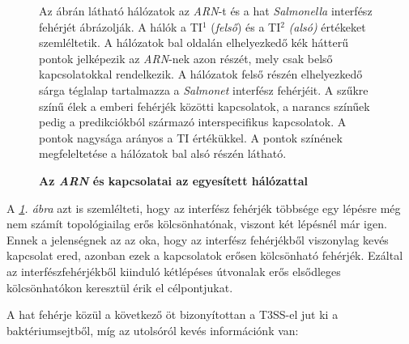 \documentclass[a4paper,12pt]{article}
\newenvironment{imgdesc}{
		\small
		\singlespacing
		\begin{center}
		
	}{
		\end{center}	
	}
\begin{document}
\begin{figure}[H]
					\centering
					\caption{ \textbf{Az \textit{ARN} és kapcsolatai az egyesített hálózattal}}		
					\label{fig:connection}
					\begin{imgdesc}
					Az ábrán látható hálózatok az \textit{ARN}-t és a hat \textit{Salmonella} interfész fehérjét ábrázolják. A hálók a TI$^1$ (\textit{felső}) és a TI$^2$ \textit{(alsó)} értékeket szemléltetik. A hálózatok bal oldalán elhelyezkedő kék hátterű pontok jelképezik az \textit{ARN}-nek azon részét, mely csak belső kapcsolatokkal rendelkezik. A hálózatok felső részén elhelyezkedő sárga téglalap tartalmazza a \textit{Salmonet} interfész fehérjéit. A szűkre színű élek a emberi fehérjék közötti kapcsolatok, a narancs színűek pedig a predikciókból származó interspecifikus kapcsolatok. A pontok nagysága arányos a TI értékükkel. A pontok színének megfeleltetése a hálózatok bal alsó részén látható. 
					\end{imgdesc}			 		 
				\end{figure}
		 
		 A \textit{\ref{fig:connection}. ábra} azt is szemlélteti, hogy az interfész fehérjék többsége egy lépésre még nem számít topológiailag erős kölcsönhatónak, viszont két lépésnél már igen. Ennek a jelenségnek az az oka, hogy az interfész fehérjékből viszonylag kevés kapcsolat ered, azonban ezek a kapcsolatok erősen kölcsönható fehérjék. Ezáltal az interfészfehérjékből kiinduló kétlépéses útvonalak erős elsődleges kölcsönhatókon keresztül érik el célpontjukat.
		


				
		\noindent A hat fehérje közül a következő öt bizonyítottan a T3SS-el jut ki a baktériumsejtből, míg az utolsóról kevés információnk van: 
		
\end{document}
